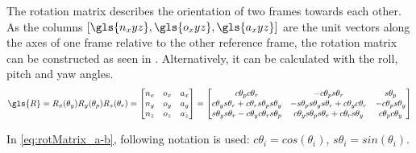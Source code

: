 The rotation matrix describes the orientation of two frames towards each other. As the columns $[\gls{n_xyz},\gls{o_xyz},\gls{a_xyz}]$ are the unit vectors along the axes of one frame relative to the other reference frame, %
the rotation matrix can be constructed 
as seen in  . Alternatively, it can be calculated with the roll, pitch and yaw angles. \cite{CorkeRoboticVisionControl}\cite{craig1986introduction}
\begin{equation}\label{eq:rotMatrix_a-b}
\gls{R} =
R_x(\theta_y)R_y(\theta_p)R_z(\theta_r)
=
\begin{bmatrix}
n_x & o_x & a_x \\
n_y & o_y & a_y \\
n_z & o_z & a_z \\
\end{bmatrix}
=
\begin{bmatrix}
c\theta_p c\theta_r & -c\theta_p s\theta_r & s\theta_p \\
c\theta_y s\theta_r + c\theta_r s\theta_p s\theta_y & -s\theta_p s\theta_y s\theta_r + c\theta_y c\theta_r & -c\theta_p s\theta_y \\
s\theta_y s\theta_r - c\theta_y c\theta_r s\theta_p & c\theta_y s\theta_p s\theta_r + c\theta_r s\theta_y & c\theta_p c\theta_y \\
\end{bmatrix}
\end{equation}

In \ref{eq:rotMatrix_a-b}, following notation is used:
$c \theta_i = cos(\theta_i)$, $s \theta_i = sin(\theta_i)$.




